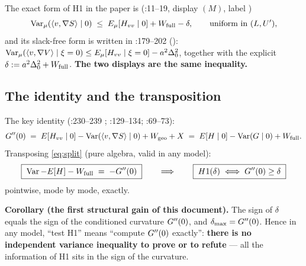 The exact form of H1 in the paper is (:11--19, display $(M)$, label
)
\begin{equation}
  \operatorname{Var}_\mu(\langle v,\nabla S\rangle \mid 0) \;\le\; E_\mu[H_{vv}\mid 0] + W_{\mathrm{full}} - \delta ,
  \qquad \text{uniform in } (L,U') ,
  \label{eq:M}
\end{equation}
and its slack-free form is written in :179--202 ():
$\operatorname{Var}_\mu(\langle v,\nabla V\rangle\mid \xi=0) \le E_\mu[H_{vv}\mid\xi=0]-a^{2}\Delta_0^{2}$,
together with the explicit $\delta := a^{2}\Delta_0^{2} + W_{\mathrm{full}}$. \textbf{The two displays are the same
inequality.} \LT
{}

\subsection{The identity and the transposition}

The key identity (:230--239 ; :129--134;
:69--73):
\begin{equation}
  G''(0) \;=\; E[H_{vv}\mid 0] - \operatorname{Var}(\langle v,\nabla S\rangle\mid 0) + W_{\mathrm{geo}} + X
        \;=\; E[H\mid 0] - \operatorname{Var}(G\mid 0) + W_{\mathrm{full}} .
  \label{eq:split}
\end{equation}
Transposing \eqref{eq:split} (pure algebra, valid in any model):
\begin{equation}
  \boxed{\;\operatorname{Var} - E[H] - W_{\mathrm{full}} \;=\; -G''(0)\;}
  \qquad\Longrightarrow\qquad
  \boxed{\;H1(\delta) \iff G''(0) \ge \delta\;}
  \label{eq:equiv}
\end{equation}
pointwise, mode by mode, exactly. \LT
{}

\begin{keybox}
\textbf{Corollary (the first structural gain of this document).} The sign of $\delta$ equals the
sign of the conditioned curvature $G''(0)$, and $\delta_{\max} = G''(0)$. Hence in any model, ``test H1''
means ``compute $G''(0)$ exactly'': \textbf{there is no independent variance inequality to prove or to
refute} --- all the information of H1 sits in the sign of the curvature. \LT
\end{keybox}

